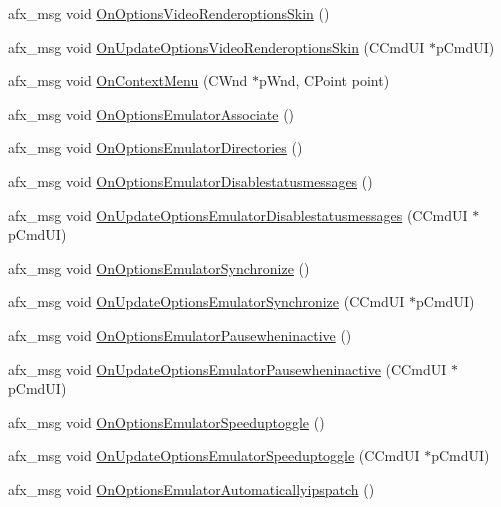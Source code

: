 \begin{DoxyCompactItemize}
\item 
afx\+\_\+msg void \mbox{\hyperlink{class_main_wnd_a5f44893bd6c5452bbd514c034ee15fbd}{On\+Options\+Video\+Renderoptions\+Skin}} ()
\item 
afx\+\_\+msg void \mbox{\hyperlink{class_main_wnd_a2ad43f4ad55a02c28d1c288c4b5afe7c}{On\+Update\+Options\+Video\+Renderoptions\+Skin}} (C\+Cmd\+UI $\ast$p\+Cmd\+UI)
\item 
afx\+\_\+msg void \mbox{\hyperlink{class_main_wnd_ad3e0c95642b4f96e97e699f67e6e8d39}{On\+Context\+Menu}} (C\+Wnd $\ast$p\+Wnd, C\+Point point)
\item 
afx\+\_\+msg void \mbox{\hyperlink{class_main_wnd_a824b678e28dacab4a43b4ac0918e8555}{On\+Options\+Emulator\+Associate}} ()
\item 
afx\+\_\+msg void \mbox{\hyperlink{class_main_wnd_a5d36b0308cca73a7aa4af8df269a743c}{On\+Options\+Emulator\+Directories}} ()
\item 
afx\+\_\+msg void \mbox{\hyperlink{class_main_wnd_adaf6a97c2076cf3b509e5847f57c223d}{On\+Options\+Emulator\+Disablestatusmessages}} ()
\item 
afx\+\_\+msg void \mbox{\hyperlink{class_main_wnd_a21587f86709a0f12079e3eb7b51c60dd}{On\+Update\+Options\+Emulator\+Disablestatusmessages}} (C\+Cmd\+UI $\ast$p\+Cmd\+UI)
\item 
afx\+\_\+msg void \mbox{\hyperlink{class_main_wnd_a7c06835a2c41f9999bd1ac57573b1ca5}{On\+Options\+Emulator\+Synchronize}} ()
\item 
afx\+\_\+msg void \mbox{\hyperlink{class_main_wnd_a8a7e869df1655fe77cb450db712fd9a9}{On\+Update\+Options\+Emulator\+Synchronize}} (C\+Cmd\+UI $\ast$p\+Cmd\+UI)
\item 
afx\+\_\+msg void \mbox{\hyperlink{class_main_wnd_a0def4f8d03a9034f1644571a029cd062}{On\+Options\+Emulator\+Pausewheninactive}} ()
\item 
afx\+\_\+msg void \mbox{\hyperlink{class_main_wnd_a10dd32a50e583f5ddb0d2af4ecfd0440}{On\+Update\+Options\+Emulator\+Pausewheninactive}} (C\+Cmd\+UI $\ast$p\+Cmd\+UI)
\item 
afx\+\_\+msg void \mbox{\hyperlink{class_main_wnd_a3c88d3d358d76bb7ef362fa7c4b1be4b}{On\+Options\+Emulator\+Speeduptoggle}} ()
\item 
afx\+\_\+msg void \mbox{\hyperlink{class_main_wnd_af19332119096c90e31ee0c2f49ec8359}{On\+Update\+Options\+Emulator\+Speeduptoggle}} (C\+Cmd\+UI $\ast$p\+Cmd\+UI)
\item 
afx\+\_\+msg void \mbox{\hyperlink{class_main_wnd_a346906f834cf5c654550dafab20e864c}{On\+Options\+Emulator\+Automaticallyipspatch}} ()

\end{DoxyCompactItemize}
